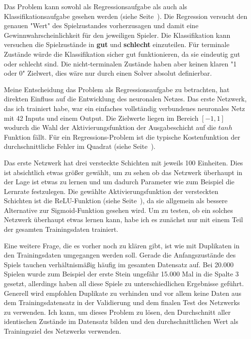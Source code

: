 Das Problem kann sowohl als Regressionsaufgabe als auch als Klassifikationsaufgabe gesehen werden (siehe Seite~\pageref{chap:regression-classification}).
Die Regression versucht den genauen "Wert" des Spielzustandes vorherzusagen und damit eine Gewinnwahrscheinlichkeit für den jeweiligen Spieler.
Die Klassifikation kann versuchen die Spielzustände in \textbf{gut} und \textbf{schlecht} einzuteilen.
Für terminale Zustände würde die Klassifikation sicher gut funktionieren, da sie eindeutig gut oder schlecht sind.
Die nicht-terminalen Zustände haben aber keinen klaren "1 oder 0" Zielwert, dies wäre nur durch einen Solver absolut definierbar.

Meine Entscheidung das Problem als Regressionsaufgabe zu betrachten, hat direkten Einfluss auf die Entwicklung des neuronalen Netzes.
Das erste Netzwerk, das ich trainiert habe, war ein einfaches vollständig verbundenes neuronales Netz mit 42 Inputs und einem Output.
Die Zielwerte liegen im Bereich $[-1,1]$ wodurch die Wahl der Aktivierungsfunktion der Ausgabeschicht auf die $tanh$ Funktion fällt.
Für ein Regressions-Problem ist die typische Kostenfunktion der durchschnittliche Fehler im Quadrat (siehe Seite~\pageref{chap:cost-function}).

Das erste Netzwerk hat drei versteckte Schichten mit jeweils 100 Einheiten.
Dies ist absichtlich etwas größer gewählt, um zu sehen ob das Netzwerk überhaupt in der Lage ist etwas zu lernen und um dadurch Parameter wie zum Beispiel die Lernrate festzulegen.
Die gewählte Aktivierungsfunktion der versteckten Schichten ist die ReLU-Funktion (siehe Seite~\pageref{chap:activations}), da sie allgemein als bessere Alternative zur Sigmoid-Funktion gesehen wird.
Um zu testen, ob ein solches Netzwerk überhaupt etwas lernen kann, habe ich es zunächst nur mit einem Teil der gesamten Trainingsdaten trainiert.

Eine weitere Frage, die es vorher noch zu klären gibt, ist wie mit Duplikaten in den Trainingsdaten umgegangen werden soll.
Gerade die Anfangszustände des Spiels tauchen verhältnismäßig häufig im gesamten Datensatz auf.
Bei 20.000 Spielen wurde zum Beispiel der erste Stein ungefähr 15.000 Mal in die Spalte 3 gesetzt, allerdings haben all diese Spiele zu unterschiedlichen Ergebnisse geführt.
Generell wird empfohlen Duplikate zu verhinden und vor allem keine Daten aus dem Trainingsdatensatz in der Validierung und dem finalen Test des Netzwerks zu verwenden.
Ich kann, um dieses Problem zu lösen, den Durchschnitt aller identischen Zustände im Datensatz bilden und den durchschnittlichen Wert als Trainingsziel des Netzwerks verwenden.

